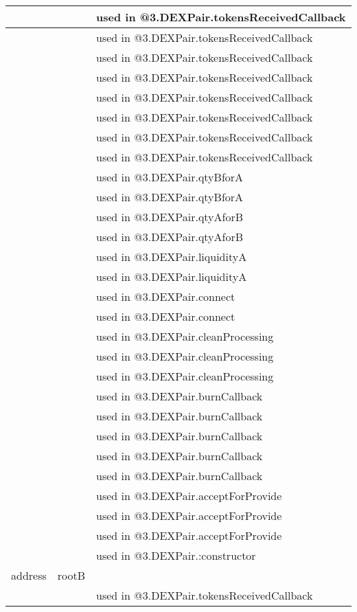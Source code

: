 \begin{tabular}{|l|l|p{5cm}|}
 & & used in @3.DEXPair.tokensReceivedCallback\\\hline
 & & used in @3.DEXPair.tokensReceivedCallback\\\hline
 & & used in @3.DEXPair.tokensReceivedCallback\\\hline
 & & used in @3.DEXPair.tokensReceivedCallback\\\hline
 & & used in @3.DEXPair.tokensReceivedCallback\\\hline
 & & used in @3.DEXPair.tokensReceivedCallback\\\hline
 & & used in @3.DEXPair.tokensReceivedCallback\\\hline
 & & used in @3.DEXPair.tokensReceivedCallback\\\hline
 & & used in @3.DEXPair.qtyBforA\\\hline
 & & used in @3.DEXPair.qtyBforA\\\hline
 & & used in @3.DEXPair.qtyAforB\\\hline
 & & used in @3.DEXPair.qtyAforB\\\hline
 & & used in @3.DEXPair.liquidityA\\\hline
 & & used in @3.DEXPair.liquidityA\\\hline
 & & used in @3.DEXPair.connect\\\hline
 & & used in @3.DEXPair.connect\\\hline
 & & used in @3.DEXPair.cleanProcessing\\\hline
 & & used in @3.DEXPair.cleanProcessing\\\hline
 & & used in @3.DEXPair.cleanProcessing\\\hline
 & & used in @3.DEXPair.burnCallback\\\hline
 & & used in @3.DEXPair.burnCallback\\\hline
 & & used in @3.DEXPair.burnCallback\\\hline
 & & used in @3.DEXPair.burnCallback\\\hline
 & & used in @3.DEXPair.burnCallback\\\hline
 & & used in @3.DEXPair.acceptForProvide\\\hline
 & & used in @3.DEXPair.acceptForProvide\\\hline
 & & used in @3.DEXPair.acceptForProvide\\\hline
 & & used in @3.DEXPair.:constructor\\\hline
address & rootB &  \\\hline
 & & used in @3.DEXPair.tokensReceivedCallback\\\hline

\end{tabular}
